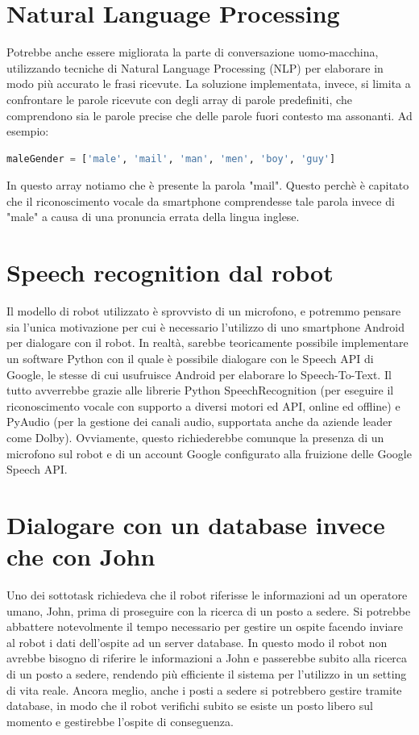 \documentclass[italian, twoside]{sapthesis} %
\begin{document}
\section{Natural Language Processing}
Potrebbe anche essere migliorata la parte di conversazione uomo-macchina, utilizzando tecniche di Natural Language Processing (NLP) per elaborare in modo più accurato le frasi ricevute. La soluzione implementata, invece, si limita a confrontare le parole ricevute con degli array di parole predefiniti, che comprendono sia le parole precise che delle parole fuori contesto ma assonanti. Ad esempio:
\begin{lstlisting}[language=Python]
maleGender = ['male', 'mail', 'man', 'men', 'boy', 'guy']
\end{lstlisting}
In questo array notiamo che è presente la parola "mail". Questo perchè è capitato che il riconoscimento vocale da smartphone comprendesse tale parola invece di "male" a causa di una pronuncia errata della lingua inglese.

\section{Speech recognition dal robot}
Il modello di robot utilizzato è sprovvisto di un microfono, e potremmo pensare sia l'unica motivazione per cui è necessario l'utilizzo di uno smartphone Android per dialogare con il robot. In realtà, sarebbe teoricamente possibile implementare un software Python con il quale è possibile dialogare con le Speech API di Google, le stesse di cui usufruisce Android per elaborare lo Speech-To-Text. Il tutto avverrebbe grazie alle librerie Python SpeechRecognition (per eseguire il riconoscimento vocale con supporto a diversi motori ed API, online ed offline) e PyAudio (per la gestione dei canali audio, supportata anche da aziende leader come Dolby). Ovviamente, questo richiederebbe comunque la presenza di un microfono sul robot e di un account Google configurato alla fruizione delle Google Speech API.

\section{Dialogare con un database invece che con John}
Uno dei sottotask richiedeva che il robot riferisse le informazioni ad un operatore umano, John, prima di proseguire con la ricerca di un posto a sedere. Si potrebbe abbattere notevolmente il tempo necessario per gestire un ospite facendo inviare al robot i dati dell'ospite ad un server database. In questo modo il robot non avrebbe bisogno di riferire le informazioni a John e passerebbe subito alla ricerca di un posto a sedere, rendendo più efficiente il sistema per l'utilizzo in un setting di vita reale. Ancora meglio, anche i posti a sedere si potrebbero gestire tramite database, in modo che il robot verifichi subito se esiste un posto libero sul momento e gestirebbe l’ospite di conseguenza.
\end{document}
